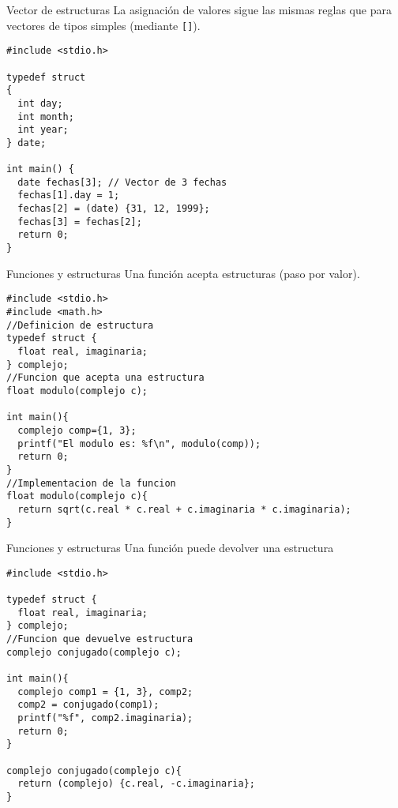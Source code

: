 \documentclass[xcolor={usenames,svgnames,dvipsnames}, aspectratio=169]{beamer}
\begin{document}
\begin{frame}[label={sec:orgb254889},fragile,plain]{Vector de estructuras}
 La asignación de valores sigue las mismas reglas que para vectores de tipos simples (mediante \texttt{[]}).
\lstset{language=C,label= ,caption= ,captionpos=b,numbers=none}
\begin{lstlisting}
#include <stdio.h>

typedef struct
{
  int day;
  int month;
  int year;
} date;

int main() {
  date fechas[3]; // Vector de 3 fechas
  fechas[1].day = 1;
  fechas[2] = (date) {31, 12, 1999};
  fechas[3] = fechas[2];
  return 0;
}
\end{lstlisting}
\end{frame}

\begin{frame}[label={sec:org48fb3f6},fragile,plain]{Funciones y estructuras}
 Una función acepta estructuras (\alert{paso por valor}).

\lstset{language=C,label= ,caption= ,captionpos=b,numbers=none}
\begin{lstlisting}
#include <stdio.h>
#include <math.h>
//Definicion de estructura
typedef struct {
  float real, imaginaria;
} complejo;
//Funcion que acepta una estructura
float modulo(complejo c);

int main(){
  complejo comp={1, 3};
  printf("El modulo es: %f\n", modulo(comp));
  return 0;
}
//Implementacion de la funcion
float modulo(complejo c){
  return sqrt(c.real * c.real + c.imaginaria * c.imaginaria);
}
\end{lstlisting}
\end{frame}

\begin{frame}[label={sec:org0263ad9},fragile,plain]{Funciones y estructuras}
 Una función puede devolver una estructura

\lstset{language=C,label= ,caption= ,captionpos=b,numbers=none}
\begin{lstlisting}
#include <stdio.h>

typedef struct {
  float real, imaginaria;
} complejo;
//Funcion que devuelve estructura
complejo conjugado(complejo c);

int main(){
  complejo comp1 = {1, 3}, comp2;
  comp2 = conjugado(comp1);
  printf("%f", comp2.imaginaria);
  return 0;
}

complejo conjugado(complejo c){
  return (complejo) {c.real, -c.imaginaria}; 
}
\end{lstlisting}
\end{frame}
\end{document}
